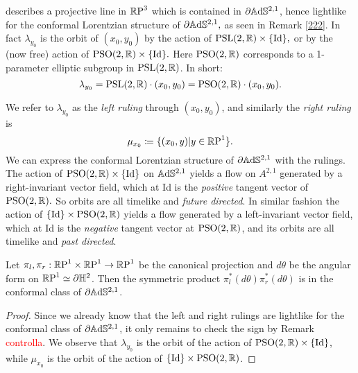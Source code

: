 describes a projective line in $\R\text{P}^3$ which is contained in $\partial\A^{2,1}$, hence lightlike for the conformal Lorentzian structure of $\partial\A^{2,1},$ as seen in Remark \ref{222}. In fact $\lambda_{y_0}$ is the orbit of $(x_0,y_0)$ by the action of $\PSL\times\{\text{Id}\},$ or by the (now free) action of $\text{PSO}(2,\R)\times\{\text{Id}\}.$ Here $\text{PSO}(2,\R)$ corresponds to a 1-parameter elliptic subgroup in $\PSL$. In short: 
\[
    \lambda_{y_0}=\PSL\cdot(x_0,y_0)=\text{PSO}(2,\R)\cdot(x_0,y_0).
\]

We refer to $\lambda_{y_0}$ as the \textit{left ruling} through $(x_0,y_0)$, and similarly the \textit{right ruling} is 
\[
    \mu_{x_0}\coloneqq\{(x_0,y)|y\in\R\text{P}^1\}.
\]
We can express the conformal Lorentzian structure of $\partial\A^{2,1}$ with the rulings. The action of $\text{PSO}(2,\R)\times\{\text{Id}\}$ on $\A^{2,1}$ yields a flow on $A^{2,1}$ generated by a right-invariant vector field, which at Id is the \textit{positive } tangent vector of $\text{PSO}(2,\R).$ So orbits are all timelike and \textit{future directed}. In similar fashion the action of $\{\text{Id}\}\times\text{PSO}(2,\R)$ yields a flow generated by a left-invariant vector field, which at Id is the \textit{negative} tangent vector at $\text{PSO}(2,\R)$, and its orbits are all timelike and \textit{past directed}. 
\begin{proposition}
    Let $\pi_l,\pi_r:\S\times\S\to\S$ be the canonical projection and $d\theta$ be the angular form on $\S\simeq\partial\H^2$. Then the symmetric product $\pi_l^*(d\theta)\pi_r^*(d\theta)$ is in the conformal class of $\partial\A^{2,1}$.
\end{proposition}  
\begin{proof}
 Since we already know that the left and right rulings are lightlike for the conformal class of $\partial\A^{2,1}$, it only remains to check the sign by Remark \textcolor{red}{controlla}. We observe that $\lambda_{y_0}$ is the orbit of the action of $\text{PSO}(2,\R)\times\{\text{Id}\}$, while $\mu_{x_0}$ is the orbit of the action of $\{\text{Id}\}\times\text{PSO}(2,\R)$. 
\end{proof}


